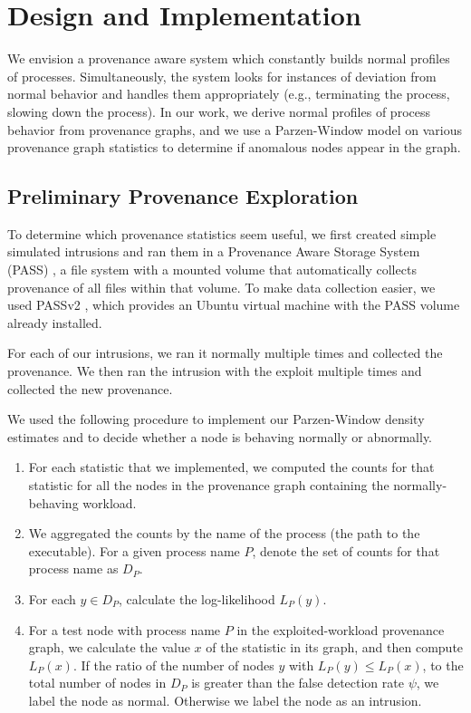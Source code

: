 \documentclass[10pt,twocolumn]{article}
\begin{document}
%

\section{Design and Implementation}

We envision a provenance aware system which constantly builds normal profiles of processes. Simultaneously,
the system looks for instances of deviation from normal behavior and handles them appropriately
(e.g., terminating the process, slowing down the process). In our work, we derive normal profiles of process behavior
from provenance graphs, and we use a Parzen-Window model on various provenance graph statistics
to determine if anomalous nodes appear in the graph.

\subsection{Preliminary Provenance Exploration}

To determine which provenance statistics seem useful, we first created simple simulated intrusions
and ran them in a Provenance Aware Storage System (PASS) \cite{pass}, a file system with
a mounted volume that automatically collects provenance of all files within that volume.
To make data collection easier, we used PASSv2 \cite{passv2}, which provides an Ubuntu virtual machine with
the PASS volume already installed.

For each of our intrusions, we ran it normally multiple times and collected the provenance. We then ran the
intrusion with the exploit multiple times and collected the new provenance.

We used the following procedure to implement our Parzen-Window density estimates and to decide whether a node is behaving normally or abnormally.
\begin{enumerate}
\item For each statistic that we implemented, we computed the counts for that statistic for all the
nodes in the provenance graph containing the normally-behaving workload.
\item We aggregated the counts by the name of the process (the path to the executable). For a given process name $P$, denote the
set of counts for that process name as $D_P$.
\item For each $y \in D_P$, calculate the log-likelihood $L_P(y)$.
\item For a test node with process name $P$ in the exploited-workload provenance graph, we calculate the value $x$ of the statistic in its graph, and then compute $L_P(x)$. 
If the ratio of the number of nodes $y$ with $L_P(y) \leq L_P(x)$,
to the total number of nodes in $D_P$ is greater than the false detection rate $\psi$, we label the node as normal. Otherwise we label the node as
an intrusion.
\end{enumerate}
\end{document}
